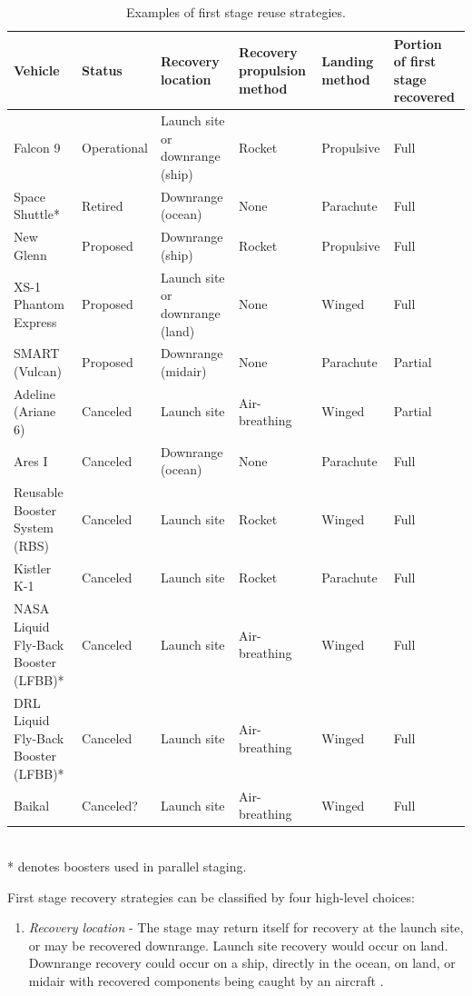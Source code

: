 \documentclass{iaf-iac}
\begin{document}
\begin{multicols}{2}
\begin{table}
    \caption{\label{tab:vehicles} Examples of first stage reuse strategies.}
    \centering
    \begin{tabular}{p{3.5cm} l p{2cm} p{2cm} p{2cm} p{2cm}}
        \hline
        Vehicle & Status & Recovery location & Recovery propulsion method &  Landing method & Portion of first stage recovered \\
        \hline
        \hline
        Falcon 9 \cite{Falcon9} & Operational & Launch site or downrange (ship) & Rocket & Propulsive & Full \\
        \hline
        Space Shuttle* & Retired & Downrange (ocean) & None & Parachute &  Full \\
        \hline
        New Glenn \cite{NewGlenn} & Proposed & Downrange (ship) & Rocket & Propulsive & Full \\
        XS-1 Phantom Express \cite{DARPA_XS1, Sloss18} & Proposed & Launch site or downrange (land) & None & Winged & Full \\
        SMART (Vulcan) \cite{Ragab2015} & Proposed & Downrange (midair) & None & Parachute & Partial \\
        \hline
        Adeline (Ariane 6) \cite{Selding2015_adeline} & Canceled \cite{vila_dupas_2018} & Launch site & Air-breathing & Winged & Partial \\
        Ares I \cite{Ares2009} & Canceled & Downrange (ocean) & None & Parachute &  Full\\
        Reusable Booster System (RBS) \cite{NAP13534} & Canceled & Launch site & Rocket & Winged & Full\\
        Kistler K-1 \cite{Isakowitz2004} & Canceled & Launch site & Rocket & Parachute & Full\\ 
        NASA Liquid Fly-Back Booster (LFBB)* \cite{Healy1998} & Canceled & Launch site & Air-breathing & Winged & Full\\
        DRL Liquid Fly-Back Booster (LFBB)* \cite{Sippel2003} & Canceled & Launch site & Air-breathing & Winged & Full\\
        Baikal \cite{Isakowitz2004} & Canceled? & Launch site & Air-breathing & Winged & Full\\
        \hline
    \end{tabular}
    \\ * denotes boosters used in parallel staging.
\end{table}

First stage recovery strategies can be classified by four high-level choices:
\begin{enumerate}
    \item \textit{Recovery location} - The stage may return itself for recovery at the launch site, or may be recovered downrange. Launch site recovery would occur on land. Downrange recovery could occur on a ship, directly in the ocean, on land, or midair with recovered components being caught by an aircraft \cite{Ragab2015, Stappert2017}.


\end{enumerate}
\end{multicols}
\end{document}
